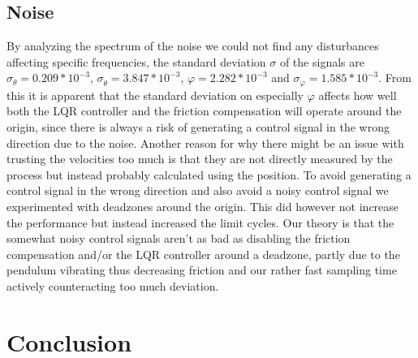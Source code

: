 \documentclass[10pt,a4paper]{article}
\begin{document}
\subsection{Noise}
By analyzing the spectrum of the noise we could not find any disturbances affecting specific frequencies, the standard deviation $ \sigma $ of the signals are $ \sigma_{ \theta } =  0.209*10^{-3} $, $ \sigma_{\dot{ \theta }}  = 3.847*10^{-3} $, $  \varphi = 2.282*10^{-3} $ and $ \sigma_{ \dot{ \varphi }} = 1.585*10^{-3} $. From this it is apparent that the standard deviation on especially $ \varphi $ affects how well both the LQR controller and the friction compensation will operate around the origin, since there is always a risk of generating a control signal in the wrong direction due to the noise. Another reason for why there might be an issue with trusting the velocities too much is that they are not directly measured by the process but instead probably calculated using the position.
To avoid generating a control signal in the wrong direction and also avoid a noisy control signal we experimented with deadzones around the origin.  This did however not increase the performance but instead increased the limit cycles. Our theory is that the somewhat noisy control signals aren't as bad as disabling the friction compensation and/or the LQR controller around a deadzone, partly due to the pendulum vibrating thus decreasing friction and our rather fast sampling time actively counteracting too much deviation.
\section{Conclusion}
\end{document}

